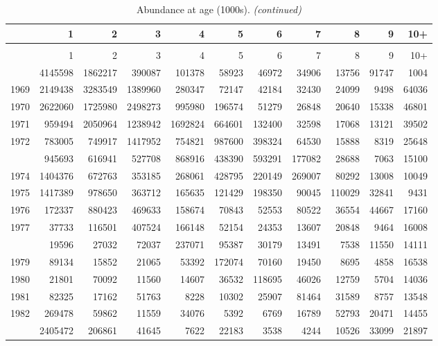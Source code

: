 \documentclass[
]{article}
\begin{document}
\begin{longtable}[t]{lrrrrrrrrrr}
\caption{\label{tab:NAA-table}Abundance at age (1000s).}\\
\toprule
  & 1 & 2 & 3 & 4 & 5 & 6 & 7 & 8 & 9 & 10+\\
\midrule
\endfirsthead
\caption[]{Abundance at age (1000s). \textit{(continued)}}\\
\toprule
  & 1 & 2 & 3 & 4 & 5 & 6 & 7 & 8 & 9 & 10+\\
\midrule
\endhead

\endfoot
\bottomrule
\endlastfoot
1968 & 4145598 & 1862217 & 390087 & 101378 & 58923 & 46972 & 34906 & 13756 & 91747 & 1004\\
1969 & 2149438 & 3283549 & 1389960 & 280347 & 72147 & 42184 & 32430 & 24099 & 9498 & 64036\\
1970 & 2622060 & 1725980 & 2498273 & 995980 & 196574 & 51279 & 26848 & 20640 & 15338 & 46801\\
1971 & 959494 & 2050964 & 1238942 & 1692824 & 664601 & 132400 & 32598 & 17068 & 13121 & 39502\\
1972 & 783005 & 749917 & 1417952 & 754821 & 987600 & 398324 & 64530 & 15888 & 8319 & 25648\\
\addlinespace
1973 & 945693 & 616941 & 527708 & 868916 & 438390 & 593291 & 177082 & 28688 & 7063 & 15100\\
1974 & 1404376 & 672763 & 353185 & 268061 & 428795 & 220149 & 269007 & 80292 & 13008 & 10049\\
1975 & 1417389 & 978650 & 363712 & 165635 & 121429 & 198350 & 90045 & 110029 & 32841 & 9431\\
1976 & 172337 & 880423 & 469633 & 158674 & 70843 & 52553 & 80522 & 36554 & 44667 & 17160\\
1977 & 37733 & 116501 & 407524 & 166148 & 52154 & 24353 & 13607 & 20848 & 9464 & 16008\\
\addlinespace
1978 & 19596 & 27032 & 72037 & 237071 & 95387 & 30179 & 13491 & 7538 & 11550 & 14111\\
1979 & 89134 & 15852 & 21065 & 53392 & 172074 & 70160 & 19450 & 8695 & 4858 & 16538\\
1980 & 21801 & 70092 & 11560 & 14607 & 36532 & 118695 & 46026 & 12759 & 5704 & 14036\\
1981 & 82325 & 17162 & 51763 & 8228 & 10302 & 25907 & 81464 & 31589 & 8757 & 13548\\
1982 & 269478 & 59862 & 11559 & 34076 & 5392 & 6769 & 16789 & 52793 & 20471 & 14455\\
\addlinespace
1983 & 2405472 & 206861 & 41645 & 7622 & 22183 & 3538 & 4244 & 10526 & 33099 & 21897\\

\end{longtable}
\end{document}
